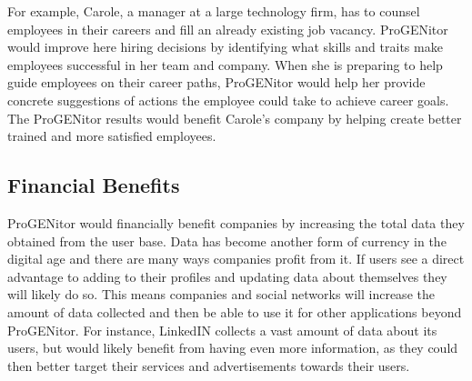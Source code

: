 For example, Carole, a manager at a large technology firm, has to counsel
employees in their careers and fill an already existing job vacancy.  ProGENitor would
improve here hiring decisions by identifying what skills and traits make
employees successful in her team and company.  When she is preparing to help
guide employees  on their career paths, ProGENitor would help her provide
concrete suggestions of actions the employee could take to achieve career goals.
The ProGENitor results  would benefit Carole's company by helping create better
trained and more satisfied employees.

\subsection{Financial Benefits}
ProGENitor would financially benefit companies by increasing the total data
they obtained from the user base.  Data has become another form of currency in
the digital age and there are many ways companies profit from it.  If users see
a direct advantage to adding to their profiles and updating data about
themselves they will likely do so.  This means companies and social networks
will increase the amount of data collected and then be able to use it for other
applications beyond ProGENitor.  For instance, LinkedIN collects a vast amount
of data about its users, but would likely benefit from having even more
information, as they could then better target their services and advertisements
towards their users.
